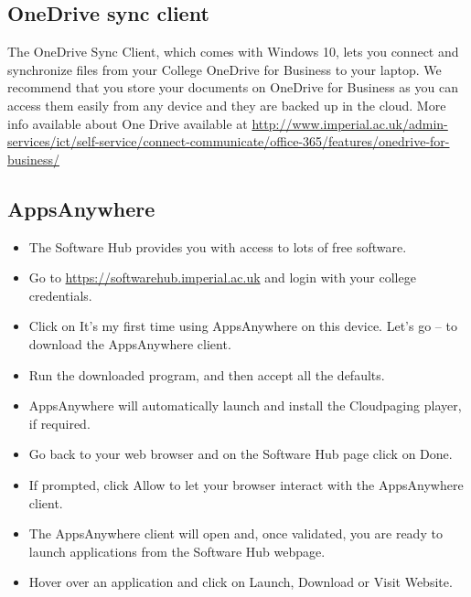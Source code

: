 \documentclass[11pt]{article}
\begin{document}
\subsection{OneDrive sync client}
The OneDrive Sync Client, which comes with Windows 10, lets you connect and synchronize files from your College OneDrive for Business to your laptop. We recommend that you store your documents on OneDrive for Business as you can access them easily from any device and they are backed up in the cloud.
More info available about One Drive available at \url{http://www.imperial.ac.uk/admin-services/ict/self-service/connect-communicate/office-365/features/onedrive-for-business/}

\subsection{AppsAnywhere} 
\begin{itemize}
  \item The Software Hub provides you with access to lots of free software.
  \item Go to \url{https://softwarehub.imperial.ac.uk} and login with your college credentials.
  \item Click on It’s my first time using AppsAnywhere on this device. Let’s go – to download the AppsAnywhere client.
  \item Run the downloaded program, and then accept all the defaults.
  \item AppsAnywhere will automatically launch and install the Cloudpaging player, if required.
  \item Go back to your web browser and on the Software Hub page click on Done.
  \item If prompted, click Allow to let your browser interact with the AppsAnywhere client.
  \item The AppsAnywhere client will open and, once validated, you are ready to launch applications from the Software Hub webpage.
  \item Hover over an application and click on Launch, Download or Visit Website.
\end{itemize}
\end{document}
